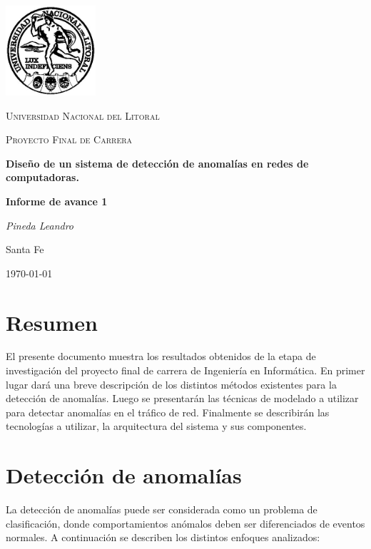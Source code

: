 \documentclass[a4paper,10pt, oneside]{article}
\begin{document}
	
\begin{titlepage}
	\centering
	\includegraphics[width=0.25\textwidth]{../../Universidad_del_Litoral}\par\vspace{1cm}
	{\scshape\LARGE Universidad Nacional del Litoral \par}
	\vspace{1cm}
	{\scshape\Large Proyecto Final de Carrera\par}
	\vspace{1.5cm}
	{\huge\bfseries Diseño de un sistema de detección de anomalías en redes de computadoras.\par}
	\vspace{4cm}
	{\huge\bfseries Informe de avance 1\par}
	\vfill
	
	{\Large \itshape Pineda Leandro\par}
	
	
	\large Santa Fe\par
	{\large \today\par}	
\end{titlepage}

\modulolinenumbers[5]
\linenumbers


\section{Resumen}
El presente documento muestra los resultados obtenidos de la etapa de investigación del proyecto final de carrera de Ingeniería en Informática. En primer lugar dará una breve descripción de los distintos métodos existentes para la detección de anomalías. Luego se presentarán las técnicas de modelado a utilizar para detectar anomalías en el tráfico de red. Finalmente se describirán las tecnologías a utilizar, la arquitectura del sistema y sus componentes. 

\section{Detección de anomalías}
La detección de anomalías puede ser considerada como un problema de clasificación, donde comportamientos anómalos deben ser diferenciados de eventos normales\cite{baddar2014anomaly}. A continuación se describen los distintos enfoques analizados:
\end{document}
